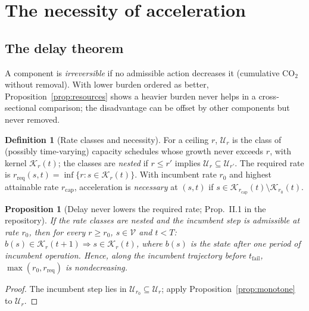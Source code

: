 \documentclass[11pt]{article}
\theoremstyle{plain}
\newtheorem{proposition}[theorem]{Proposition}
\theoremstyle{definition}
\newtheorem{definition}{Definition}
\newcommand{\K}{\mathcal{K}}
\newcommand{\V}{\mathcal{V}}
\newcommand{\U}{\mathcal{U}}
\newcommand{\fail}{\mathrm{fail}}
\begin{document}
\section{The necessity of acceleration}
\label{sec:accel}

\subsection{The delay theorem}

A component is \emph{irreversible} if no admissible action decreases it (cumulative CO$_2$ without removal). With lower burden ordered as better, Proposition~\ref{prop:resources} shows a heavier burden never helps in a cross-sectional comparison; the disadvantage can be offset by other components but never removed.

\begin{definition}[Rate classes and necessity]
For a ceiling $r$, $\U_r$ is the class of (possibly time-varying) capacity schedules whose growth never exceeds $r$, with kernel $\K_r(t)$; the classes are \emph{nested} if $r\le r'$ implies $\U_r\subseteq\U_{r'}$. The required rate is $r_{\mathrm{req}}(s,t)=\inf\{r:s\in\K_r(t)\}$. With incumbent rate $r_0$ and highest attainable rate $r_{\mathrm{cap}}$, acceleration is \emph{necessary} at $(s,t)$ if $s\in\K_{r_{\mathrm{cap}}}(t)\setminus\K_{r_0}(t)$.
\end{definition}

\begin{proposition}[Delay never lowers the required rate; Prop.~II.1 in the repository]\label{prop:delay}
If the rate classes are nested and the incumbent step is admissible at rate $r_0$, then for every $r\ge r_0$, $s\in\V$ and $t<T$: $b(s)\in\K_r(t+1)\Rightarrow s\in\K_r(t)$, where $b(s)$ is the state after one period of incumbent operation. Hence, along the incumbent trajectory before $t_\fail$, $\max(r_0,r_{\mathrm{req}})$ is nondecreasing.
\end{proposition}
\begin{proof}
The incumbent step lies in $\U_{r_0}\subseteq\U_r$; apply Proposition~\ref{prop:monotone} to $\U_r$.
\end{proof}
\end{document}

